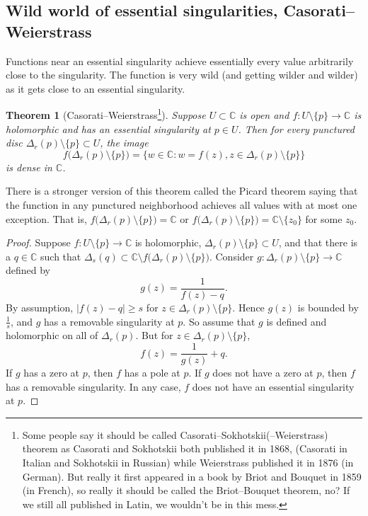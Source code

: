 \documentclass[12pt,openany]{book}
\newcommand{\sabs}[1]{\lvert {#1} \rvert}
\newcommand{\C}{{\mathbb{C}}}
\theoremstyle{plain}
\newtheorem{thm}{Theorem}[section]
\theoremstyle{remark}
\theoremstyle{definition}
\theoremstyle{exercise}
\theoremstyle{example}
\begin{document}
\subsection{Wild world of essential singularities, Casorati--Weierstrass}

Functions near an essential singularity achieve essentially every value
arbitrarily close to the singularity.  The function is very wild (and
getting wilder and wilder) as it gets close to an essential singularity.

\begin{thm}[Casorati--Weierstrass\footnote{%
Some people say it should be called Casorati--Sokhotskii(--Weierstrass) theorem as
Casorati and Sokhotskii both published it in 1868, (Casorati in Italian
and Sokhotskii in Russian) while Weierstrass published it in 1876 (in
German).  But really it first appeared in a book by Briot and Bouquet in
1859 (in French), so really it should be called the Briot--Bouquet theorem,
no?  If we still all published in Latin, we wouldn't be in this
mess.}]
Suppose $U \subset \C$ is open and $f \colon U \setminus \{ p \} \to \C$ is holomorphic and has
an essential singularity at $p \in U$.  Then for every punctured disc
$\Delta_r(p) \setminus \{ p \} \subset U$, the image
\begin{equation*}
f\bigl(\Delta_r(p) \setminus \{ p \} \bigr)
=
\bigl\{ w \in \C : w = f(z), z \in \Delta_r(p) \setminus \{ p \} \bigr\}
\end{equation*}
is dense in $\C$.
\end{thm}

There is a stronger version
of this theorem called the Picard theorem saying that the function in any
punctured neighborhood achieves all values with at most one exception.
That is,
$f\bigl(\Delta_r(p) \setminus \{ p \} \bigr) = \C$ or 
$f\bigl(\Delta_r(p) \setminus \{ p \} \bigr) = \C \setminus \{ z_0 \}$ for
some $z_0$.

\begin{proof}
Suppose $f \colon U \setminus \{ p \} \to \C$ is holomorphic,
$\Delta_r(p) \setminus \{ p \} \subset U$,
and that
there is a $q \in \C$ such that $\Delta_s(q) \subset \C
\setminus 
f\bigl(\Delta_r(p) \setminus \{ p \} \bigr)$.
Consider $g \colon \Delta_r(p) \setminus \{p\} \to \C$ defined by
\begin{equation*}
g(z) = \frac{1}{f(z) - q} .
\end{equation*}
By assumption, $\sabs{f(z)-q} \geq s$ for $z \in \Delta_r(p) \setminus
\{p\}$.
Hence $g(z)$ is bounded by $\frac{1}{s}$, and $g$ has a removable
singularity at $p$.  So
assume that $g$ is defined and holomorphic on all of
$\Delta_r(p)$.  But for $z \in \Delta_r(p) \setminus \{ p \}$,
\begin{equation*}
f(z) = \frac{1}{g(z)} + q .
\end{equation*}
If $g$ has a zero at $p$, then $f$ has a pole at $p$.  If $g$ does not
have a zero at $p$, then $f$ has a removable singularity.  In any case,
$f$ does not have an essential singularity at $p$.
\end{proof}
\end{document}
